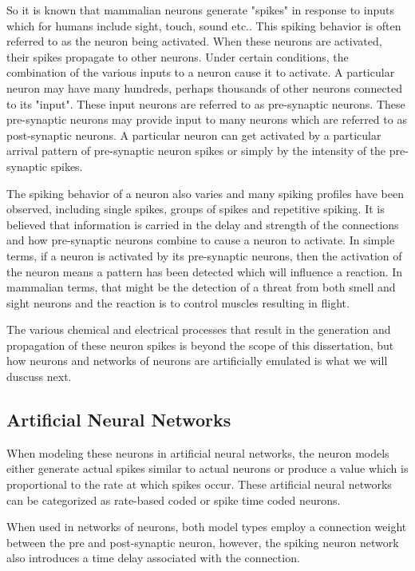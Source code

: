 \iftrue
So it is known that mammalian neurons generate "spikes" in response to inputs which for humans include sight, touch, sound etc.. This spiking behavior is often referred to as the neuron being activated.
When these neurons are activated, their spikes propagate to other neurons. Under certain conditions, the combination of the various inputs to a neuron cause it to activate. 
A particular neuron may have many hundreds, perhaps thousands of other neurons connected to its "input".
These input neurons are referred to as pre-synaptic neurons. These pre-synaptic neurons may provide input to many neurons which are referred to as post-synaptic neurons.
A particular neuron can get activated by a particular arrival pattern of pre-synaptic neuron spikes or simply by the intensity of the pre-synaptic spikes. 

The spiking behavior of a neuron also varies and many spiking profiles have been observed, including single spikes, groups of spikes and repetitive spiking. 
It is believed that information is carried in the delay and strength of the connections and how pre-synaptic neurons combine to cause a neuron to activate.
In simple terms, if a neuron is activated by its pre-synaptic neurons, then the activation of the neuron means a pattern has been detected which will influence a reaction.
In mammalian terms, that might be the detection of a threat from both smell and sight neurons and the reaction is to control muscles resulting in flight.


The various chemical and electrical processes that result in the generation and propagation of these neuron spikes is beyond the scope of this dissertation, but how neurons and networks of neurons are artificially emulated is what we will duscuss next.


\subsection*{Artificial Neural Networks}
\label{sec:Artificial Neural Networks}

When modeling these neurons in artificial neural networks, the neuron models either generate actual spikes similar to actual neurons or
produce a value which is proportional to the rate at which spikes occur.
These artificial neural networks can be categorized as rate-based coded or spike time coded neurons.


When used in networks of neurons, both model types employ a connection weight between the pre and post-synaptic neuron, however, the spiking neuron network also introduces a time delay associated with the connection.

